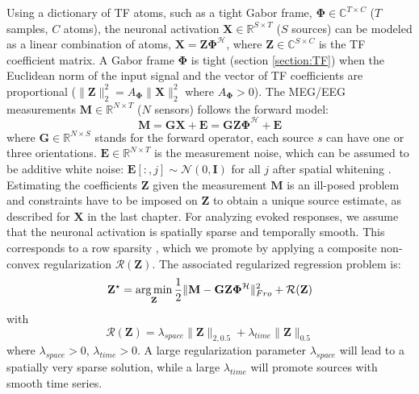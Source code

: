 Using a dictionary of TF atoms, such as a tight Gabor frame, $\mathbf{\Phi} \in \mathbb{C}^{T \times C}$
($T$ samples, $C$ atoms), the neuronal activation $\mathbf{X} \in \mathbb{R}^{S \times T}$ ($S$ sources) can be modeled as a linear combination of atoms, $\mathbf{X}=\mathbf{Z\Phi}^{\mathcal{H}}$, where $\mathbf{Z} \in \mathbb{C}^{S \times C}$ is the TF coefficient matrix. A Gabor frame $\mathbf{\Phi}$ is tight (section \ref{section:TF}) when the Euclidean norm of the input signal and the vector of TF coefficients are proportional ($\|\mathbf{Z}\|_2^2 = A_\mathbf{\Phi} \|\mathbf{X}\|_2^2$ where $A_\mathbf{\Phi}>0$). %
The MEG/EEG measurements $\mathbf{M} \in \mathbb{R}^{N \times T}$ ($N$ sensors) follows the forward model:
\begin{equation} \label{eq:reg_prob_tf}
    \mathbf{M} = \mathbf{GX + E} = \mathbf{GZ \Phi^{\mathcal{H}} + E}
\end{equation}
where $\mathbf{G} \in \mathbb{R}^{N \times S}$ stands for the forward operator, each source $s$ can have one or three orientations. $\mathbf{E} \in \mathbb{R}^{N \times T}$ is the measurement noise, which can be assumed to be additive white noise: $\mathbf{E}[:, j] \sim \mathcal{N}(0, \mathbf{I})$ for all $j$ after spatial whitening \cite{denis}. Estimating the coefficients $\mathbf{Z}$ given the measurement $\mathbf{M}$ is an ill-posed problem and constraints have to be imposed on $\mathbf{Z}$ to obtain a unique source estimate, as described for $\mathbf{X}$ in the last chapter. For analyzing evoked responses, we assume that the neuronal activation is spatially sparse and temporally smooth. This corresponds to a row sparsity \cite{Alex13}, which we promote by applying a composite non-convex regularization $\mathcal{R}(\mathbf{Z})$. The associated regularized regression problem is:
\begin{equation} \label{eq2}
    \mathbf{Z}^\star = \mathop{\mathrm{arg}\,\mathrm{min}}_{\mathbf{Z}} \frac{1}{2}\|\mathbf{M - GZ\Phi^\mathcal{H}}\|^2_{Fro} + \mathcal{R}(\mathbf{Z})
\end{equation}
with
\begin{equation}
	\mathcal{R}(\mathbf{Z}) = \lambda_{space}\|\mathbf{Z}\|_{2,0.5} + \lambda_{time}\|\mathbf{Z}\|_{0.5}
\end{equation}
where $\lambda_{space} > 0$, $\lambda_{time}>0$. A large regularization parameter $\lambda_{space}$ will lead to a spatially very sparse solution, while a large $\lambda_{time}$ will promote sources with smooth time series.

